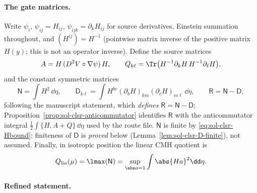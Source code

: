 \documentclass[../main.tex]{subfiles}
\begin{document}
\paragraph{The gate matrices.}
Write $\psi_{i}$, $\psi_{ij}=H_{ij}$, $\psi_{ijk}=\partial_kH_{ij}$ for source derivatives,
Einstein summation throughout, and $(H^{ij})=H^{-1}$ (pointwise matrix inverse of the positive
matrix $H(y)$; this is not an operator inverse).  Define the source matrices
\begin{equation}
  A=H\,(D^2V\circ\nabla\psi)\,H,\qquad
  Q_{k\ell}=\Tr\bigl(H^{-1}\partial_kH\,H^{-1}\partial_\ell H\bigr),
  \label{eq:sol-clsr-AQ-def}
\end{equation}
and the constant symmetric matrices
\begin{equation}
  \mathsf N=\int H^2\,\dd\eta,\qquad
  \mathsf D_{k\ell}=\int H^{bc}(\partial_bH)_{km}(\partial_cH)_{m\ell}\,\dd\eta,\qquad
  \mathsf R=\mathsf N-\mathsf D,
  \label{eq:sol-clsr-NDR-def}
\end{equation}
following the manuscript statement, which \emph{defines} $\mathsf R=\mathsf N-\mathsf D$;
Proposition~\ref{prop:sol-clsr-anticommutator} identifies $\mathsf R$ with the anticommutator
integral $\tfrac12\int\{H,A+Q\}\,\dd\eta$ used by the route file.  $\mathsf N$ is finite by
\eqref{eq:sol-clsr-Hbound}; finiteness of $\mathsf D$ is \emph{proved} below
(Lemma~\ref{lem:sol-clsr-D-finite}), not assumed.  Finally, in isotropic position the linear
CMH quotient is
\[
  Q_{\mathrm{lin}}(\mu)=\lmax(\mathsf N)
  =\sup_{\abs a=1}\int\abs{Ha}^2\dd\eta .
\]

\paragraph{Refined statement.}
\end{document}
